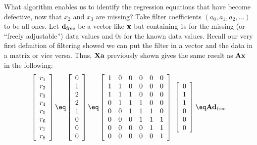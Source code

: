 \par
What algorithm enables us to identify the regression equations
that have become defective, now that $x_2$ and $x_3$ are missing?
Take filter coefficients $(a_0, a_1, a_2,\ldots)$ to be all ones.
Let $\bold d_{\rm free}$ be a vector like $\bold x$ but containing 1s for
the missing (or ``freely adjustable'') data values and 0s for
the known data values.
Recall our very first definition of filtering showed we can put
the filter in a vector and the data in a matrix or vice versa.
Thus,
$\bold X \bold a$
previously shown gives the same result as $\bold A \bold x$ in the
following:
\begin{equation}
\left[
        \begin{array}{c}
          r_1 \\
          r_2 \\
          r_3 \\
          r_4 \\
          r_5 \\
          r_6 \\
          r_7 \\
          r_8
          \end{array}
\right]
\eq
\left[
        \begin{array}{c}
          0 \\
          1 \\
          2 \\
          2 \\
          1 \\
          0 \\
          0 \\
          0
          \end{array}
\right]
\eq
        \left[
        \begin{array}{cccccc}
          1   & 0   & 0 &0 &0  &0 \\
          1   & 1   & 0 &0 &0  &0 \\
          1   & 1   & 1 &0 &0  &0 \\
          0   & 1   & 1 &1 &0  &0 \\
          0   & 0   & 1 &1 &1  &0 \\
          0   & 0   & 0 &1 &1  &1 \\
          0   & 0   & 0 &0 &1  &1 \\
          0   & 0   & 0 &0 &0  &1   
          \end{array} \right]
        \; \left[
        \begin{array}{c}
          0 \\
          1 \\
          1 \\
          0 \\
          0 \\
          0 \end{array} \right]
\eq
	\bold A \bold d_{\rm free}
\label{eqn:twomissing}
\end{equation}
